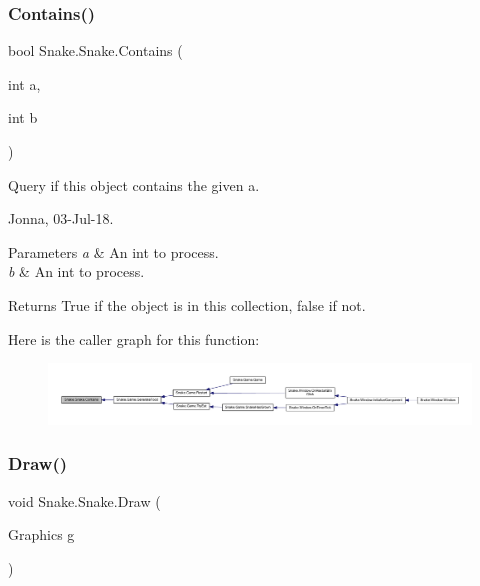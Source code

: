 \subsubsection{\texorpdfstring{Contains()}{Contains()}}
{\footnotesize\ttfamily bool Snake.\+Snake.\+Contains (\begin{DoxyParamCaption}\item[{int}]{a,  }\item[{int}]{b }\end{DoxyParamCaption})}



Query if this object contains the given a. 

Jonna, 03-\/\+Jul-\/18. 


\begin{DoxyParams}{Parameters}
{\em a} & An int to process. \\
\hline
{\em b} & An int to process. \\
\hline
\end{DoxyParams}


\begin{DoxyReturn}{Returns}
True if the object is in this collection, false if not. 
\end{DoxyReturn}
Here is the caller graph for this function\+:
\nopagebreak
\begin{figure}[H]
\begin{center}
\leavevmode
\includegraphics[width=350pt]{dd/d78/class_snake_1_1_snake_a06b5d8a17c2d94cd6c979cef1c275eda_icgraph}
\end{center}
\end{figure}
\mbox{\label{class_snake_1_1_snake_ae1a73925b1a95fb087c26d87fe16a79f}} 
\subsubsection{\texorpdfstring{Draw()}{Draw()}}
{\footnotesize\ttfamily void Snake.\+Snake.\+Draw (\begin{DoxyParamCaption}\item[{Graphics}]{g }\end{DoxyParamCaption})}



